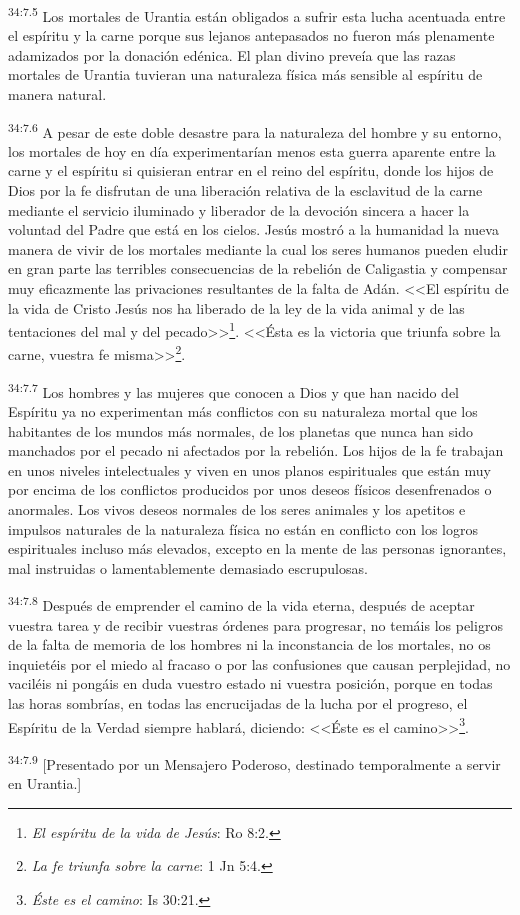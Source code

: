 \par
\textsuperscript{34:7.5} Los mortales de Urantia están obligados a sufrir esta lucha acentuada entre el espíritu y la carne porque sus lejanos antepasados no fueron más plenamente adamizados por la donación edénica. El plan divino preveía que las razas mortales de Urantia tuvieran una naturaleza física más sensible al espíritu de manera natural.

\par
\textsuperscript{34:7.6} A pesar de este doble desastre para la naturaleza del hombre y su entorno, los mortales de hoy en día experimentarían menos esta guerra aparente entre la carne y el espíritu si quisieran entrar en el reino del espíritu, donde los hijos de Dios por la fe disfrutan de una liberación relativa de la esclavitud de la carne mediante el servicio iluminado y liberador de la devoción sincera a hacer la voluntad del Padre que está en los cielos. Jesús mostró a la humanidad la nueva manera de vivir de los mortales mediante la cual los seres humanos pueden eludir en gran parte las terribles consecuencias de la rebelión de Caligastia y compensar muy eficazmente las privaciones resultantes de la falta de Adán. <<El espíritu de la vida de Cristo Jesús nos ha liberado de la ley de la vida animal y de las tentaciones del mal y del pecado>>\footnote{\textit{El espíritu de la vida de Jesús}: Ro 8:2.}. <<Ésta es la victoria que triunfa sobre la carne, vuestra fe misma>>\footnote{\textit{La fe triunfa sobre la carne}: 1 Jn 5:4.}.

\par
\textsuperscript{34:7.7} Los hombres y las mujeres que conocen a Dios y que han nacido del Espíritu ya no experimentan más conflictos con su naturaleza mortal que los habitantes de los mundos más normales, de los planetas que nunca han sido manchados por el pecado ni afectados por la rebelión. Los hijos de la fe trabajan en unos niveles intelectuales y viven en unos planos espirituales que están muy por encima de los conflictos producidos por unos deseos físicos desenfrenados o anormales. Los vivos deseos normales de los seres animales y los apetitos e impulsos naturales de la naturaleza física no están en conflicto con los logros espirituales incluso más elevados, excepto en la mente de las personas ignorantes, mal instruidas o lamentablemente demasiado escrupulosas.

\par
\textsuperscript{34:7.8} Después de emprender el camino de la vida eterna, después de aceptar vuestra tarea y de recibir vuestras órdenes para progresar, no temáis los peligros de la falta de memoria de los hombres ni la inconstancia de los mortales, no os inquietéis por el miedo al fracaso o por las confusiones que causan perplejidad, no vaciléis ni pongáis en duda vuestro estado ni vuestra posición, porque en todas las horas sombrías, en todas las encrucijadas de la lucha por el progreso, el Espíritu de la Verdad siempre hablará, diciendo: <<Éste es el camino>>\footnote{\textit{Éste es el camino}: Is 30:21.}.

\par
\textsuperscript{34:7.9} [Presentado por un Mensajero Poderoso, destinado temporalmente a servir en Urantia.]